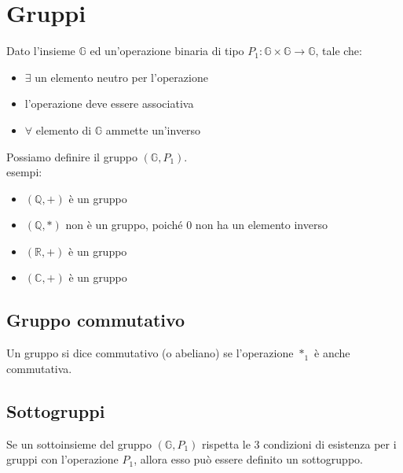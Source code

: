 \documentclass{article}
\begin{document}
\section{Gruppi}

Dato l'insieme $\mathbb{G}$ ed un'operazione binaria di tipo $P_1: \mathbb{G} \times \mathbb{G} \to \mathbb{G}$, tale che:

\begin{itemize}
    \item $\exists$  un elemento neutro per l'operazione
    \item l'operazione deve essere associativa
    \item $\forall$ elemento di $\mathbb{G}$ ammette un'inverso
\end{itemize}

\noindent
Possiamo definire il gruppo $(\mathbb{G}, P_1)$.\\

\noindent
esempi:

\begin{itemize}
    \item $(\mathbb{Q}, +)$ è un gruppo
    \item $(\mathbb{Q}, *)$ non è un gruppo, poiché $0$ non ha un elemento inverso
    \item $(\mathbb{R}, +)$ è un gruppo
    \item $(\mathbb{C}, +)$ è un gruppo
\end{itemize}

\subsection{Gruppo commutativo}

Un gruppo si dice commutativo (o abeliano) se l'operazione $*_1$ è anche commutativa.

\subsection{Sottogruppi}

Se un sottoinsieme del gruppo $(\mathbb{G}, P_1)$ rispetta le 3 condizioni di esistenza per i gruppi con l'operazione $P_1$, allora esso può essere definito un sottogruppo.
\end{document}
